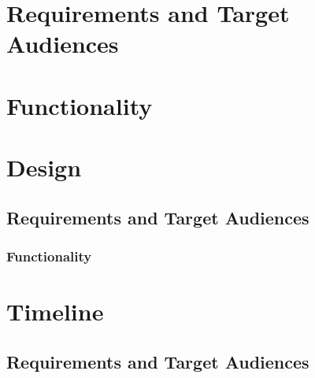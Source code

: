 \documentclass[paper=a4, fontsize=11pt]{scrartcl} %
\numberwithin{equation}{section} %
\numberwithin{figure}{section} %
\numberwithin{table}{section} %
\begin{document}
\section{Requirements and Target Audiences}


\section{Functionality}


\section{Design}


\subsection{Requirements and Target Audiences}


\subsubsection{Functionality}


\section{Timeline}


\subsection{Requirements and Target Audiences}
\end{document}

